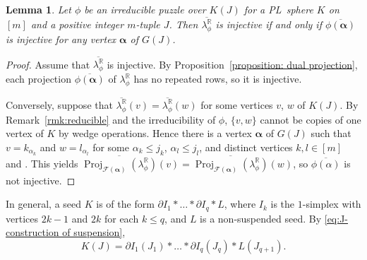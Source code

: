 \documentclass[11pt]{amsart}
\theoremstyle{plain}
\newtheorem{lemma}[theorem]{Lemma}
\numberwithin{equation}{section}
\theoremstyle{definition}
\newcommand{\R}{\mathbb{R}}
\newcommand{\cF}{\mathcal{F}}
\DeclareMathOperator{\proj}{Proj}
\begin{document}
\begin{lemma} \label{lemma:irreducible IDCM}
    Let $\phi$ be an irreducible puzzle over $K(J)$ for a PL~sphere $K$ on $[m]$ and a positive integer $m$-tuple $J$.
    Then $\overline{\lambda_\phi^\R}$ is injective if and only if $\overline{\phi(\bm{\alpha})}$ is injective for any vertex $\bm{\alpha}$ of $G(J)$.
\end{lemma}

\begin{proof}
    Assume that $\overline{\lambda_\phi^\R}$ is injective.
    By Proposition~\ref{proposition: dual projection}, each projection $\overline{\phi(\bm{\alpha})}$ of $\lambda_\phi^\R$ has no repeated rows, so it is injective.

    Conversely, suppose that $\overline{\lambda_\phi^\R}(v) = \overline{\lambda_\phi^\R}(w)$ for some vertices $v$, $w$ of $K(J)$.
    By Remark~\ref{rmk:reducible} and the irreducibility of $\phi$, $\{v, w\}$ cannot be copies of one vertex of $K$ by wedge operations.
    Hence there is a vertex $\bm{\alpha}$ of $G(J)$ such that $v = k_{\alpha_k}$ and $w = l_{\alpha_{l}}$ for some $\alpha_k \leq j_k$, $\alpha_l \leq j_l$, and distinct vertices $k, l \in [m]$ and .
    This yields $\overline{\proj_{\cF(\bm{\alpha})}(\lambda_\phi^\R)}(v) = \overline{\proj_{\cF(\bm{\alpha})}(\lambda_\phi^\R)}(w)$, so $\overline{\phi(\alpha)}$ is not injective.
\end{proof}

In general, a seed $K$ is of the form $\partial I_1 \ast \dots \ast \partial I_q \ast L$, where $I_k$ is the $1$-simplex with vertices $2k-1$ and $2k$ for each $k \leq q$, and $L$ is a non-suspended seed.
By \eqref{eq:J-construction of suspension}, \begin{equation}\label{eq:J-construction}
                                                     K(J) = \partial I_1(J_1) \ast \dots \ast \partial I_q(J_q) \ast L(J_{q+1}).
                                                   \end{equation}
                                                                                                   
\end{document}
